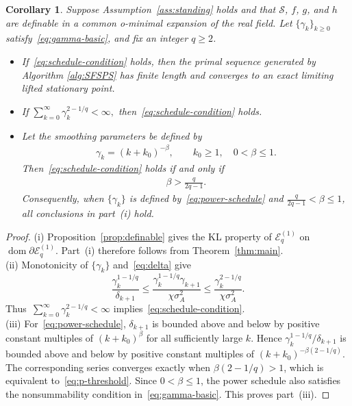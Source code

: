 \documentclass[9pt]{article}
\numberwithin{equation}{section}
\newtheorem{corollary}[theorem]{Corollary}
\theoremstyle{definition}
\theoremstyle{remark}
\newcommand{\Sset}{\mathcal S}
\newcommand{\Ecal}{\mathcal E}
\DeclareMathOperator{\dom}{dom}
\begin{document}
\begin{corollary}\label{cor:definable-main}
Suppose Assumption~\ref{ass:standing} holds and that
$\Sset$, $f$, $g$, and $h$ are definable in a common o-minimal
expansion of the real field. Let $\{\gamma_k\}_{k\geq0}$
satisfy~\eqref{eq:gamma-basic}, and fix an integer $q\geq2$.
\begin{itemize}
\item[(i)] If~\eqref{eq:schedule-condition} holds, then the primal sequence generated by Algorithm \ref{alg:SFSPS} has finite length and converges to an exact limiting lifted stationary point.
\item[(ii)] If
$ \sum_{k=0}^{\infty}\gamma_k^{2-1/q}<\infty,
$
then~\eqref{eq:schedule-condition} holds.
\item[(iii)] Let the smoothing parameters be defined by
\begin{eqnarray}\label{eq:power-schedule}
 \gamma_k=(k+k_0)^{-\beta},\qquad k_0\geq1,\quad 0<\beta\leq1.
\end{eqnarray}
Then~\eqref{eq:schedule-condition} holds if and only if
\begin{eqnarray}\label{eq:p-threshold}
 \beta>\frac{q}{2q-1}.
\end{eqnarray}
Consequently, when $\{\gamma_k\}$ is defined by~\eqref{eq:power-schedule} and
$\frac{q}{2q-1}<\beta\leq1$,
all
conclusions  in part~{\rm(i)} hold.
\end{itemize}
\end{corollary}
\begin{proof}
(i) Proposition~\ref{prop:definable} gives the KL property of
$\Ecal_q^{(1)}$ on $\dom\partial\Ecal_q^{(1)}$.
Part~(i) therefore follows from Theorem~\ref{thm:main}.\\
(ii) Monotonicity of $\{\gamma_k\}$ and~\eqref{eq:delta} give
\[
 \frac{\gamma_k^{1-1/q}}{\delta_{k+1}}
 \leq\frac{\gamma_k^{1-1/q}\gamma_{k+1}}{\chi\sigma_A^2}
 \leq\frac{\gamma_k^{2-1/q}}{\chi\sigma_A^2}.
\]
Thus~$ \sum_{k=0}^{\infty}\gamma_k^{2-1/q}<\infty$ implies~\eqref{eq:schedule-condition}.\\
(iii) For~\eqref{eq:power-schedule}, $\delta_{k+1}$ is bounded above and
below by positive constant multiples of $(k+k_0)^\beta$ for all
sufficiently large $k$. Hence
$\gamma_k^{1-1/q}/\delta_{k+1}$ is bounded above and below by
positive constant multiples of $(k+k_0)^{-\beta(2-1/q)}$.
The corresponding series converges exactly when
$\beta(2-1/q)>1$, which is equivalent to~\eqref{eq:p-threshold}.
Since $0<\beta\leq1$, the power schedule also satisfies the
nonsummability condition in~\eqref{eq:gamma-basic}. This proves
part~(iii).
\end{proof}
\end{document}
